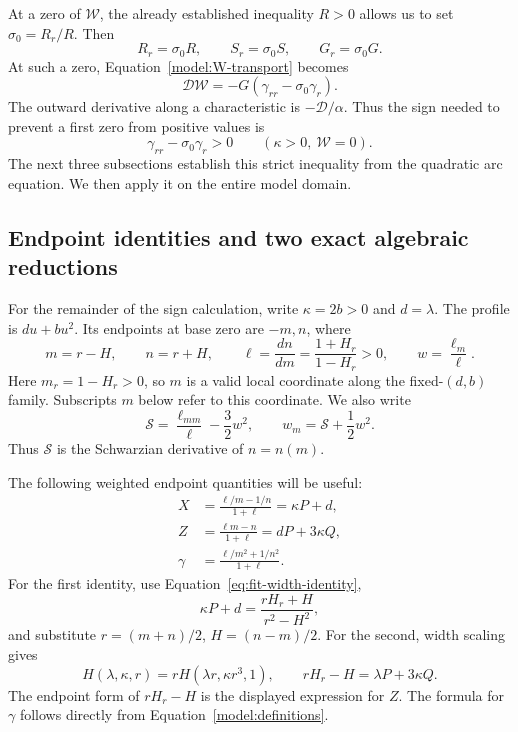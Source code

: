 At a zero of \(\mathcal W\), the already established inequality \(R>0\)
allows us to set \(\sigma_0=R_r/R\).  Then
\begin{equation}
 R_r=\sigma_0R,\qquad S_r=\sigma_0S,\qquad G_r=\sigma_0G.
 \label{model:zero-relations}
\end{equation}
At such a zero, Equation~\eqref{model:W-transport} becomes
\[
 \mathcal D\mathcal W
 =-G(\gamma_{rr}-\sigma_0\gamma_r).
\]
The outward derivative along a characteristic is
$-\mathcal D/\alpha$. Thus the sign needed to prevent a first zero
from positive values is
\begin{equation}
 \gamma_{rr}-\sigma_0\gamma_r>0
 \qquad(\kappa>0,\ \mathcal W=0).
 \label{model:required-zero-sign}
\end{equation}
The next three subsections establish this strict inequality from the
quadratic arc equation. We then apply it on the entire model domain.

\subsection{Endpoint identities and two exact algebraic reductions}

For the remainder of the sign calculation, write
\(\kappa=2b>0\) and \(d=\lambda\).  The profile is \(du+bu^2\).
Its endpoints at base zero are \(-m,n\), where
\begin{equation}
 m=r-H,\qquad n=r+H,\qquad
 \ell=\frac{dn}{dm}=\frac{1+H_r}{1-H_r}>0,\qquad
 w=\frac{\ell_m}{\ell}.
 \label{model:endpoint-variables}
\end{equation}
Here \(m_r=1-H_r>0\), so \(m\) is a valid local coordinate along the
fixed-\((d,b)\) family.  Subscripts \(m\) below refer to this coordinate.
We also write
\begin{equation}
 \mathcal S=\frac{\ell_{mm}}{\ell}-\frac32w^2,
 \qquad
 w_m=\mathcal S+\frac12w^2.
 \label{model:Schwarzian-definition}
\end{equation}
Thus \(\mathcal S\) is the Schwarzian derivative of \(n=n(m)\).

The following weighted endpoint quantities will be useful:
\begin{align}
 X&=\frac{\ell/m-1/n}{1+\ell}=\kappa P+d,\nonumber\\
 Z&=\frac{\ell m-n}{1+\ell}=dP+3\kappa Q,\nonumber\\
 \gamma&=\frac{\ell/m^2+1/n^2}{1+\ell}.
 \label{model:endpoint-identities}
\end{align}
For the first identity, use Equation~\eqref{eq:fit-width-identity},
\[
 \kappa P+d=\frac{rH_r+H}{r^2-H^2},
\]
and substitute \(r=(m+n)/2\), \(H=(n-m)/2\).
For the second, width scaling gives
\begin{equation}
 H(\lambda,\kappa,r)
 =rH(\lambda r,\kappa r^3,1),\qquad
 rH_r-H=\lambda P+3\kappa Q.
 \label{model:scaling}
\end{equation}
The endpoint form of \(rH_r-H\) is the displayed expression for \(Z\).
The formula for \(\gamma\) follows directly from
Equation~\eqref{model:definitions}.

